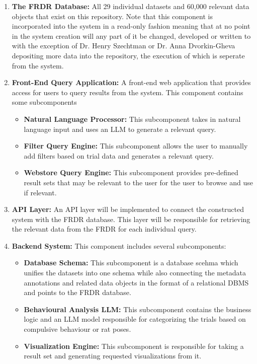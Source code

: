 \documentclass{article}
\begin{document}
\begin{enumerate}
    \item \textbf{The FRDR Database:} All 29 individual datasets and 60,000 relevant data objects that exist on this repository. Note that this component is
    incorporated into the system in a read-only fashion meaning that at no point in the system creation will any part of it be changed, developed or written to
    with the exception of Dr. Henry Szechtman or Dr. Anna Dvorkin-Gheva depositing more data into the repository, the execution of which is seperate from the system.
    \item \textbf{Front-End Query Application:} A front-end web application that provides access for users to query results from the system. This component contains
    some subcomponents
        \begin{itemize}
            \item \textbf{Natural Language Processor:} This subcomponent takes in natural language input and uses an LLM to generate a relevant query.
            \item \textbf{Filter Query Engine:} This subcomponent allows the user to manually add filters based on trial data and generates a relevant query.
            \item \textbf{Webstore Query Engine:} This subcomponent provides pre-defined result sets that may be relevant to the user for the user to browse and
            use if relevant.
        \end{itemize}
    \item \textbf{API Layer:} An API layer will be implemented to connect the constructed system with the FRDR database. This layer will be responsible for 
    retrieving the relevant data from the FRDR for each individual query.
    \item \textbf{Backend System:} This component includes several subcomponents:
        \begin{itemize}
            \item \textbf{Database Schema:} This subcomponent is a database scehma which unifies the datasets into one schema while also connecting the metadata annotations
            and related data objects in the format of a relational DBMS and points to the FRDR database.
            \item \textbf{Behavioural Analysis LLM:} This subcomponent contains the business logic and an LLM model responsible for categorizing the trials
            based on compulsive behaviour or rat poses.
            \item \textbf{Visualization Engine:} This subcomponent is responsible for taking a result set and generating requested visualizations from it.
        \end{itemize}
\end{enumerate}
\end{document}
